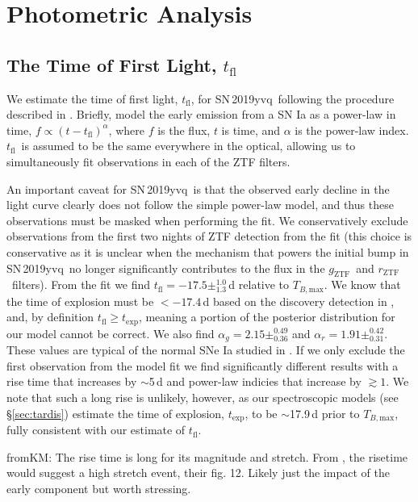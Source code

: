 \documentclass[twocolumn]{aastex63}
\newcommand{\fromkate}[1]{{\color{brown} fromKM: {#1}}}
\newcommand{\rztf}{$r_\mathrm{ZTF}$}
\newcommand{\gztf}{$g_\mathrm{ZTF}$}
\newcommand{\tfl}{$t_\mathrm{fl}$}
\newcommand{\tbmax}{$T_{B,\mathrm{max}}$}
\newcommand{\sn}{SN\,2019yvq}
\begin{document}
\section{Photometric Analysis}\label{sec:phot}

\subsection{The Time of First Light, \tfl}\label{sec:t_fl}

We estimate the time of first light, \tfl, for \sn\ following the procedure
described in \citet{Miller20}. Briefly, \citet{Miller20} model the early
emission from a SN Ia as a power-law in time, $f \propto (t -
t_\mathrm{fl})^\alpha$, where $f$ is the flux, $t$ is time, and $\alpha$ is
the power-law index. \tfl\ is assumed to be the same everywhere in the
optical, allowing us to simultaneously fit observations in each of the ZTF
filters.

An important caveat for \sn\ is that the observed early decline in the light
curve clearly does not follow the simple power-law model, and thus these
observations must be masked when performing the fit. We conservatively exclude
observations from the first two nights of ZTF detection from the fit (this
choice is conservative as it is unclear when the mechanism that powers the
initial bump in \sn\ no longer significantly contributes to the flux in the
\gztf\ and \rztf\ filters). From the fit we find \tfl$ = -17.5
\pm^{1.0}_{1.3}$\,d relative to \tbmax. We know that the time of explosion
must be $< -17.4$\,d based on the discovery detection in \citealt{Itagaki19},
and, by definition $t_\mathrm{fl} \ge t_\mathrm{exp}$, meaning a portion of
the posterior distribution for our model cannot be correct. We also find
$\alpha_g = 2.15 \pm^{0.49}_{0.36}$ and $\alpha_r = 1.91 \pm^{0.42}_{0.31}$.
These values are typical of the normal SNe Ia studied in \citet{Miller20}. If
we only exclude the first observation from the model fit we find significantly
different results with a rise time that increases by $\sim$5\,d and power-law
indicies that increase by $\gtrsim 1$. We note that such a long rise is
unlikely, however, as our spectroscopic models (see \S\ref{sec:tardis})
estimate the time of explosion, $t_\mathrm{exp}$, to be $\sim$17.9\,d prior to
\tbmax, fully consistent with our estimate of \tfl.

\fromkate{The rise time is long for its magnitude and stretch. From
\citet{Gonzalez-Gaitan12}, the risetime would suggest a high stretch event,
their fig. 12. Likely just the impact of the early component but worth
stressing. }
\end{document}
